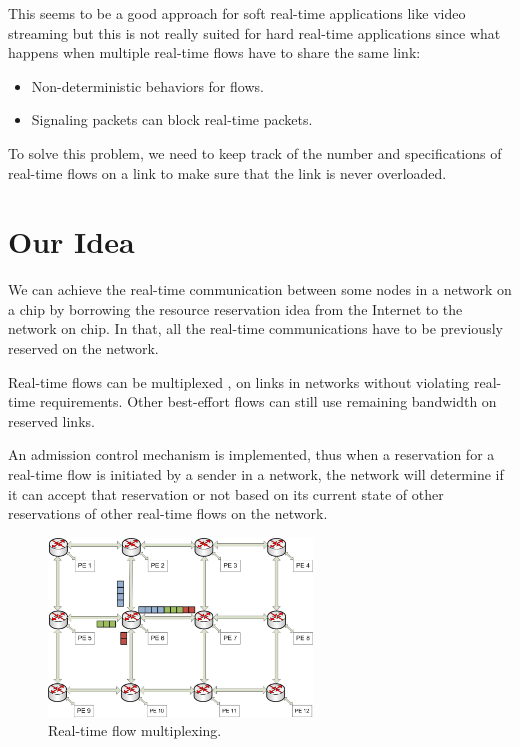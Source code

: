 \documentclass[conference, twocolumn]{IEEEtran}
\theoremstyle{definition}
\begin{document}
This seems to be a good approach for soft real-time applications like video streaming
but this is not really suited for hard real-time applications since what happens 
when multiple real-time flows have to share the same link:
\begin{itemize}
\item Non-deterministic behaviors for flows.
\item Signaling packets can block real-time packets.
\end{itemize}
To solve this problem, we need to keep track of the number and specifications of
real-time flows on a link to make sure that the link is never overloaded.

\section{Our Idea}
We can achieve the real-time communication between some nodes in a network 
on a chip by borrowing the resource reservation idea \cite{Zhang93rsvp} from the 
Internet to the network on chip. In that, all the real-time communications 
have to be previously reserved on the network. 

Real-time flows can be multiplexed \cite{Ferrari90ascheme}, \cite{ZhangService}
on links in networks without violating real-time requirements. Other best-effort
flows can still use remaining bandwidth on reserved links.

An admission control mechanism is implemented, thus when a reservation 
for a real-time flow is initiated by a sender in a network, the network will determine if 
it can accept that reservation or not based on its current state of other 
reservations of other real-time flows on the network.

\begin{figure}[htbp]
\centering
\includegraphics[width=7cm]{pics/Multiplex2}
\caption[Real time flow multiplexing.]
{Real-time flow multiplexing.}\label{fig:FlowMultiplex}
\end{figure}
\end{document}
